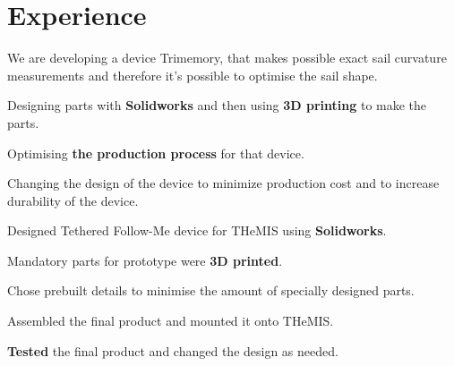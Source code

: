 \documentclass[letterpaper]{deedy-resume} %
\begin{document}
%
\begin{minipage}[t]{0.66\textwidth} %


\section{Experience}


\vspace{\topsep} %
\begin{tightitemize}
  \item We are developing a device Trimemory, that makes possible exact sail curvature measurements and therefore it's possible to optimise the sail shape.
  \item Designing parts with \textbf{Solidworks} and then using \textbf{3D printing} to make the parts.
  \item Optimising \textbf{the production process} for that device.
  \item Changing the design of the device to minimize production cost and to increase durability of the device.
\end{tightitemize}

\sectionspace %



\begin{tightitemize}
  \item Designed Tethered Follow-Me device for THeMIS using \textbf{Solidworks}.
  \item Mandatory parts for prototype were \textbf{3D printed}.
  \item Chose prebuilt details to minimise the amount of specially designed parts.
  \item Assembled the final product and mounted it onto THeMIS.
  \item \textbf{Tested} the final product and changed the design as needed.
\end{tightitemize}


\end{minipage}
\end{document}
